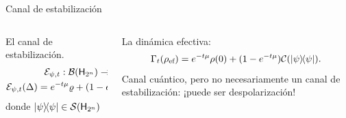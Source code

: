 \begin{frame}{Canal de estabilización}
    \begin{columns}
        \begin{column}{0.5\textwidth}
            El canal de estabilización.
            \begin{gather}
                \mcE_{\psi,t}:\mcB(\hilbert_{2^{n}}) \rightarrow \mcB(\hilbert_{2^{n}})\nonumber\\
                \mcE_{\psi,t}(\Delta)=e^{-t\mu}\varrho+(1-e^{-t \mu})\dyad{\psi}\Tr(\Delta)\rlap{.}\nonumber
            \end{gather}
            donde $\dyad{\psi}\in \densityspace{2^{n}}$
        \end{column}
        \begin{column}{0.5\textwidth}
            La dinámica efectiva:
            \begin{equation}\label{eq:EffectiveStabilizing}
                \Gamma_{t}(\rho_{\ef})=e^{-t\mu}\rho(0)+(1-e^{-t \mu})\mcC(\dyad{\psi}).\nonumber
            \end{equation}
            Canal cuántico, pero no necesariamente un canal de estabilización: ¡puede ser despolarización!
        \end{column}
    \end{columns}
\end{frame}


